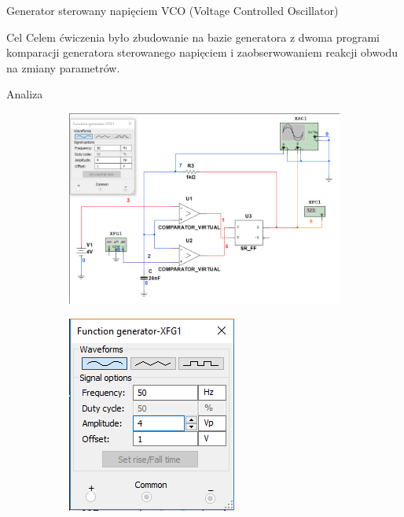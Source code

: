 \documentclass[a4paper]{scrartcl}
\begin{document}
	\begin{section}{Generator sterowany napięciem VCO (Voltage Controlled Oscillator)}
		\begin{subsection}{Cel}
			Celem ćwiczenia było zbudowanie na bazie generatora z dwoma programi komparacji generatora sterowanego napięciem i zaobserwowaniem reakcji obwodu na zmiany parametrów.
		\end{subsection}
		\begin{subsection}{Analiza}
				\begin{figure}[ht]
				\begin{subfigure}{0.75\linewidth}
				\begin{center}
					\includegraphics[width=0.74\linewidth]{05-circuit}
				\end{center}
				\end{subfigure}%
				\begin{subfigure}{0.25\linewidth}
				\begin{center}
					\includegraphics[width=\linewidth]{05-func}

\end{center}
\end{subfigure}
\end{figure}
\end{subsection}
\end{section}
\end{document}
